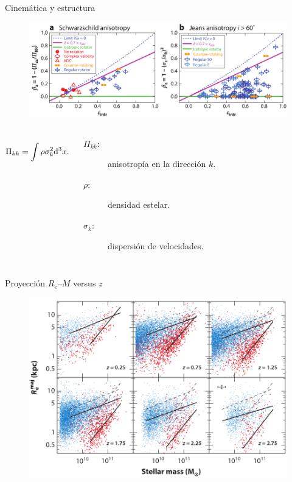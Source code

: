 \documentclass[xcolor=dvipsnames,4pt]{beamer}
\newenvironment{changemargin}[2]{%
  \begin{list}{}{%
    \setlength{\topsep}{0pt}%
    \setlength{\leftmargin}{#1}%
    \setlength{\rightmargin}{#2}%
    \setlength{\listparindent}{\parindent}%
    \setlength{\itemindent}{\parindent}%
    \setlength{\parsep}{\parskip}%
  }%
\item[]}{\end{list}}
\begin{document}
\begin{frame}{Cinemática y estructura}
\begin{changemargin}{-1cm}{-1cm}
\begin{block}{}
\begin{figure}
\includegraphics[scale=0.67]{img/dinamic.png}
\end{figure}
\end{block}

\begin{columns}
\small
{}
$$
\Pi_{kk} = \int \rho\sigma_k^2{\rm d}^3x.
$$
\begin{description}
\item[{\color{teal}$\Pi_{kk}:$}] anisotropía en la dirección $k$.
\item[{\color{teal}$\rho:$}] densidad estelar.
\item[{\color{teal}$\sigma_k:$}] dispersión de velocidades.
\end{description}
\end{columns}
\end{changemargin}
\end{frame}

\begin{frame}{Proyección $R_e$--$M$ versus $z$}
\begin{changemargin}{-1cm}{-1cm}
\begin{figure}
\centering
\includegraphics[scale=0.7]{img/r_m_z.png}
\end{figure}
\end{changemargin}

\end{frame}
\end{document}
